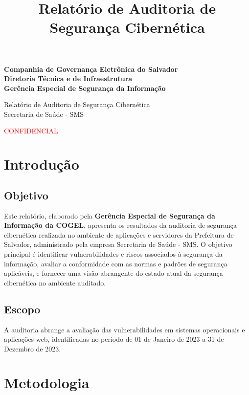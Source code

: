 \documentclass[a4paper,12pt]{article}
\title{Relatório de Auditoria de Segurança Cibernética}
\author{}
\date{}
\begin{document}
\begin{center}
    \large{\textbf{Companhia de Governança Eletrônica do Salvador\\
Diretoria Técnica e de Infraestrutura\\
Gerência Especial de Segurança da Informação\\
}}

\vspace{7cm}

\Large{Relatório de Auditoria de Segurança Cibernética\\
Secretaria de Saúde - SMS}

\vspace{4cm}
\textcolor{red}{CONFIDENCIAL}
\end{center}
\newpage

\tableofcontents  %


\newpage

\section{Introdução}
\subsection{Objetivo}
Este relatório, elaborado pela \textbf{Gerência Especial de Segurança da Informação da COGEL}, apresenta os resultados da auditoria de segurança cibernética realizada no ambiente de aplicações e servidores da Prefeitura de Salvador, administrado pela empresa Secretaria de Saúde - SMS. O objetivo principal é identificar vulnerabilidades e riscos associados à segurança da informação, avaliar a conformidade com as normas e padrões de segurança aplicáveis, e fornecer uma visão abrangente do estado atual da segurança cibernética no ambiente auditado.

\subsection{Escopo}
A auditoria abrange a avaliação das vulnerabilidades em sistemas operacionais e aplicações web, identificadas no período de 01 de Janeiro de 2023 a 31 de Dezembro de 2023.

\section{Metodologia}
\end{document}
